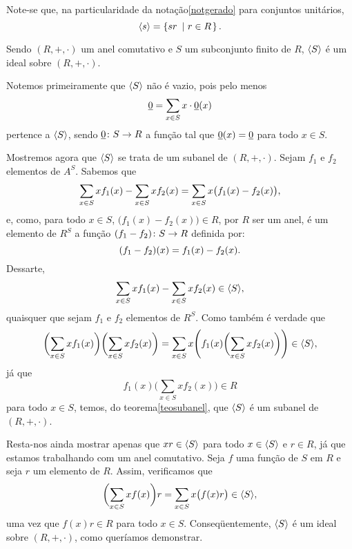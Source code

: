 \begin{Obs}\label{obsgeradounit}
  Note-se que, na particularidade da notação\xspace\ref{notgerado} para
  conjuntos unitários,
  \begin{equation*}
    \langle s\rangle = \left\{ sr\text{ }\left|\text{ }r\in R\right. \right\}\mathrm{.}
  \end{equation*}
\end{Obs}

\begin{Teo}
  Sendo $(R,+,\cdot)$ um anel comutativo
  e $S$ um subconjunto finito de
  $R$, $\langle S\rangle$ é um ideal sobre $(R,+,\cdot)$.
\end{Teo}

\begin{dem}
  Notemos primeiramente
  que $\langle S\rangle$ não é vazio, pois pelo menos
  \begin{equation*}
    \underline{0} = \sum_{x\in S}x\cdot \underline{0}(x)
  \end{equation*}
  pertence a $\langle S\rangle$, sendo $\underline{0}\colon S\rightarrow R$ a função tal que
  $\underline{0}(x)=\underline{0}$ para todo $x\in S$.

  Mostremos agora que $\langle S\rangle$ se trata de
  um subanel de $(R,+,\cdot)$.
  Sejam $f_1$ e $f_2$ elementos de
  $A^S$.  Sabemos que
  \begin{equation*}
      \sum_{x\in S}xf_1(x) - \sum_{x\in S}xf_2(x)
        = \sum_{x\in S}x\bigl(f_1(x)-f_2(x)\bigr) \mathrm{,}
  \end{equation*}
  e, como, para todo $x\in S$, $\bigl(f_1(x)-f_2(x)\bigr)\in R$, por $R$
  ser um anel, é um elemento de $R^S$
  a função $(f_1-f_2)\colon S\rightarrow R$ definida por:
  \begin{equation*}
    (f_1-f_2)(x) = f_1(x) - f_2(x)\mathrm{.}
  \end{equation*}
  Dessarte,
  \begin{equation*}
    \sum_{x\in S}xf_1(x) - \sum_{x\in S}xf_2(x)\in \langle S\rangle\mathrm{,}
  \end{equation*}
  quaisquer que sejam $f_1$ e $f_2$ elementos de $R^S$. Como também é
  verdade que
  \begin{equation*}
    \biggl(\sum_{x\in S}xf_1(x)\biggr)\biggl(\sum_{x\in S}xf_2(x)\biggr)
    = \sum_{x\in S}x
    \Biggl(f_1(x)\biggl(\sum_{x\in S}xf_2(x)\biggr)\Biggr)
    \in \langle S\rangle\mathrm{,}
  \end{equation*}
  já que
  \begin{equation*}
    f_1(x)\biggl(\sum_{x\in S}xf_2(x)\biggr)\in R
  \end{equation*}
  para todo $x\in S$, temos, do teorema\xspace\ref{teosubanel},
  que $\langle S\rangle$ é um subanel de $(R,+,\cdot)$.

  Resta-nos ainda mostrar apenas que $xr\in \langle S\rangle$
  para todo $x\in \langle S\rangle$
  e $r\in R$, já que estamos trabalhando com um anel
  comutativo.
  Seja $f$ uma função de $S$ em $R$ e
  seja $r$ um elemento de $R$. Assim, verificamos que
  \begin{equation*}
    \biggl(\sum_{x\in S}xf(x)\biggr)r =
    \sum_{x\in S}x\bigl(f(x)r\bigr)
    \in\langle S\rangle\mathrm{,}
  \end{equation*}
  uma vez que $f(x)r\in R$ para todo $x\in S$. Conseqüentemente,
  $\langle S\rangle$ é um ideal sobre $(R,+,\cdot)$, como queríamos
  demonstrar.
\end{dem}

